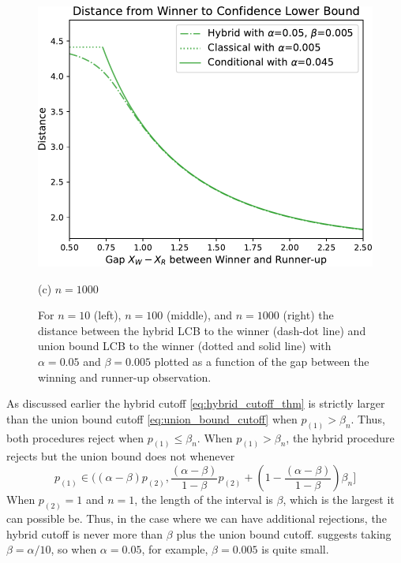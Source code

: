 \documentclass{article}
\begin{document}
\begin{appendix}
\begin{figure}
\begin{minipage}{0.32\textwidth}
    \end{minipage}
    \hfill
    \hspace{0.01\textwidth}
    \begin{minipage}{0.32\textwidth}
        \centering
        \includegraphics[width=\textwidth]{fig/hyb_dist_to_winner_n=1000.pdf}
        \caption*{(c) $n=1000$}
    \end{minipage}
    \caption{ For $n=10$ (left), $n=100$ (middle), and $n=1000$ (right) the distance between the hybrid LCB to the winner (dash-dot line) and union bound LCB to the winner (dotted and solid line) with $\alpha=0.05$ and $\beta=0.005$ plotted as a function of the gap between the winning and runner-up observation.}
    \label{fig:hybrid_union}
\end{figure}

As discussed earlier the hybrid cutoff \eqref{eq:hybrid_cutoff_thm} is strictly larger than the union bound cutoff \eqref{eq:union_bound_cutoff} when $p_{(1)} > \beta_n$. Thus, both procedures reject when $p_{(1)} \leq \beta_n$. When $p_{(1)} > \beta_n$, the hybrid procedure rejects but the union bound does not whenever  
\begin{equation*}
    p_{(1)} \in \bigg((\alpha - \beta)p_{(2)},  \frac{(\alpha - \beta)}{1-\beta}p_{(2)} + \left(1 -  \frac{(\alpha - \beta)}{1-\beta}\right)\beta_n \bigg]
\end{equation*}
When $p_{(2)} = 1$ and $n=1$, the length of the interval is $\beta$, which is the largest it can possible be. Thus, in the case where we can have additional rejections, the hybrid cutoff is never more than $\beta$ plus the union bound cutoff. \cite{Andrews2023} suggests taking $\beta=\alpha/10$, so when $\alpha = 0.05$, for example, $\beta=0.005$ is quite small. 


\end{appendix}
\end{document}
